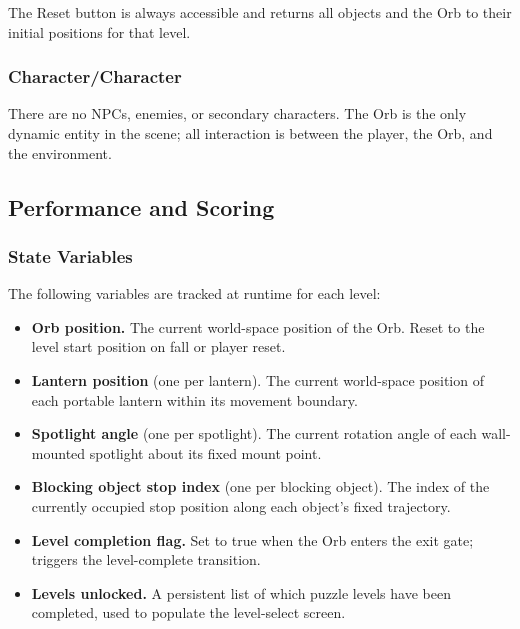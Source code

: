 \documentclass[11pt, letterpaper]{article}
\begin{document}
        The Reset button is always accessible and returns all objects and the Orb to
        their initial positions for that level.

        \subsubsection{Character/Character}
        There are no NPCs, enemies, or secondary characters. The Orb is the only
        dynamic entity in the scene; all interaction is between the player, the Orb,
        and the environment.

    \subsection{Performance and Scoring}

        \subsubsection{State Variables}
        The following variables are tracked at runtime for each level:

        \begin{itemize}[leftmargin=1.5em, itemsep=2pt]
            \item \textbf{Orb position.} The current world-space position of the Orb.
                  Reset to the level start position on fall or player reset.
            \item \textbf{Lantern position} (one per lantern). The current world-space
                  position of each portable lantern within its movement boundary.
            \item \textbf{Spotlight angle} (one per spotlight). The current rotation
                  angle of each wall-mounted spotlight about its fixed mount point.
            \item \textbf{Blocking object stop index} (one per blocking object). The
                  index of the currently occupied stop position along each object's
                  fixed trajectory.
            \item \textbf{Level completion flag.} Set to true when the Orb enters the
                  exit gate; triggers the level-complete transition.
            \item \textbf{Levels unlocked.} A persistent list of which puzzle levels
                  have been completed, used to populate the level-select screen.
        \end{itemize}
\end{document}
